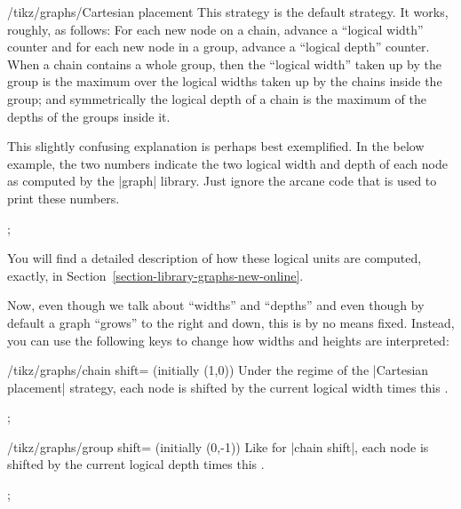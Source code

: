\begin{key}{/tikz/graphs/Cartesian placement}
  This strategy is the default strategy. It works, roughly, as
  follows: For each new node on a chain, advance a ``logical width''
  counter and for each new node in a group, advance a ``logical
  depth'' counter. When a chain contains a whole group, then the
  ``logical width'' taken up by the group is the maximum over the
  logical widths taken up by the chains inside the group; and
  symmetrically the logical depth of a chain is the maximum of the
  depths of the groups inside it.
  
  This slightly confusing explanation is perhaps best exemplified. In
  the below example, the two numbers indicate the two logical width
  and depth of each node as computed by the |graph| library. Just
  ignore the arcane code that is used to print these numbers.
\begin{codeexample}[]
\tikz
  ;
\end{codeexample}  
  You will find a detailed description of how these logical units are
  computed, exactly, in Section~\ref{section-library-graphs-new-online}.
  
  Now, even though we talk about ``widths'' and ``depths'' and even
  though by default a graph ``grows'' to the right and down, this is
  by no means fixed. Instead, you can use the following keys to change
  how widths and heights are interpreted:
  \begin{key}{/tikz/graphs/chain shift= (initially {(1,0)})}
    Under the regime of the |Cartesian placement| strategy, each node is
    shifted by the current logical width times this .
\begin{codeexample}[]
\tikz {};
\end{codeexample}
  \end{key}  
  \begin{key}{/tikz/graphs/group shift= (initially {(0,-1)})}
    Like for |chain shift|, each node is shifted by the current
    logical depth times this . 
\begin{codeexample}[]
\tikz {};
\end{codeexample}
  \end{key}  
\end{key}


